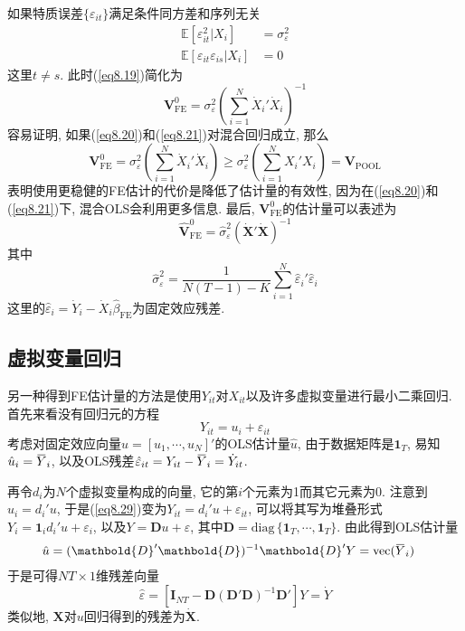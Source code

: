 \documentclass[cn, 12pt, math=mtpro2, bibstyle=apa, blue, twocol]{elegantbook}
\newcommand{\E}{\mathbb{E}}
\newcommand{\X}{\mathbold{X}}
\newcommand{\hb}{\hat{\beta}}
\newcommand{\V}{\mathbold{V}}
\newcommand{\overbar}[1]{\mkern 1.5mu\overline{\mkern-1.5mu#1\mkern-1.5mu}\mkern 1.5mu}
\begin{document}
如果特质误差$\{\varepsilon_{it}\}$满足条件同方差和序列无关
\begin{align}
\E[\varepsilon_{it}^2|X_i]&=\sigma_\varepsilon^2 \label{eq8.20} \\
\E[\varepsilon_{it}\varepsilon_{is}|X_i]&=0 \label{eq8.21}
\end{align}
这里$t\neq s$. 此时(\ref{eq8.19})简化为
$$\V_{\text{FE}}^0=\sigma_\varepsilon^2\left(\sum_{i=1}^{N}\dot{X}_i'\dot{X}_i\right)^{-1}$$
容易证明, 如果(\ref{eq8.20})和(\ref{eq8.21})对混合回归成立, 那么
$$\V_{\text{FE}}^0=\sigma_\varepsilon^2\left(\sum_{i=1}^{N}\dot{X}_i'\dot{X}_i\right)\geq \sigma_\varepsilon^2\left(\sum_{i=1}^{N}X_i'X_i\right)=\V_{\text{POOL}}$$
表明使用更稳健的FE估计的代价是降低了估计量的有效性, 因为在(\ref{eq8.20})和(\ref{eq8.21})下, 混合OLS会利用更多信息. 最后, $\V_{\text{FE}}^0$的估计量可以表述为
\begin{equation}\label{eq8.35}
  \hat{\V}_{\text{FE}}^0=\hat{\sigma}_\varepsilon^2(\dot{\X}'\dot{\X})^{-1}
\end{equation}
其中
\begin{equation}\label{eq8.24}
  \hat{\sigma}_\varepsilon^2=\frac{1}{N(T-1)-K}\sum_{i=1}^{N}\hat{\varepsilon}_i'\hat{\varepsilon}_i
\end{equation}
这里的$\hat{\varepsilon}_i=\dot{Y}_i-\dot{X}_i\hb_{\text{FE}}$为固定效应残差.
\subsection{虚拟变量回归}
另一种得到FE估计量的方法是使用$Y_{it}$对$X_{it}$以及许多虚拟变量进行最小二乘回归. 首先来看没有回归元的方程
\begin{equation}\label{eq8.29}
  Y_{it}=u_i+\varepsilon_{it}
\end{equation}
考虑对固定效应向量$u=[u_1,\cdots,u_N]'$的OLS估计量$\hat{u}$, 由于数据矩阵是$\mathbf{1}_{T}$, 易知$\hat{u}_i=\overbar{Y}_i$, 以及OLS残差$\hat{\varepsilon}_{it}=Y_{it}-\overbar{Y}_i=\dot{Y}_{it}$.

再令$d_i$为$N$个虚拟变量构成的向量, 它的第$i$个元素为1而其它元素为0. 注意到$u_i=d_i'u$, 于是(\ref{eq8.29})变为$Y_{it}=d_i'u+\varepsilon_{it}$, 可以将其写为堆叠形式$Y_i=\mathbf{1}_id_i'u+\varepsilon_i$, 以及$Y=\mathbold{D}u+\varepsilon$, 其中$\mathbold{D}=\text{diag}\,\{\mathbf{1}_T,\cdots,\mathbf{1}_T\}$. 由此得到OLS估计量
\begin{align*}
\hat{u}&=(\mathbold{D}'\mathbold{D})^{-1}\mathbold{D}'Y=\text{vec}(\overbar{Y}_i)
\end{align*}
于是可得$NT\times 1$维残差向量
$$\hat{\varepsilon}=[\mathbold{I}_{NT}-\mathbold{D}(\mathbold{D}'\mathbold{D})^{-1}\mathbold{D}']Y=\dot{Y}$$
类似地, $\X$对$u$回归得到的残差为$\dot{\X}$.
\end{document}

